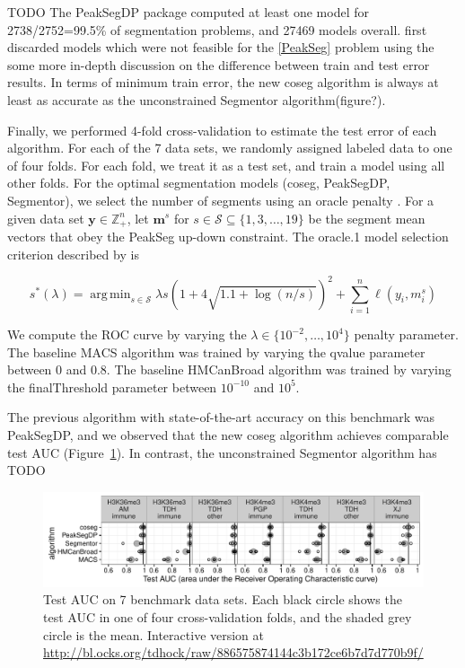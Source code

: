 \documentclass{article}
\DeclareMathOperator*{\argmin}{arg\,min}
\newcommand{\ZZ}{\mathbb Z}
\begin{document}
TODO The PeakSegDP package computed at least one model for
2738/2752=99.5\% of segmentation problems, and 27469 models
overall. first discarded models which were not feasible for the
\ref{PeakSeg} problem using the some more in-depth discussion on the
difference between train and test error results. In terms of minimum
train error, the new coseg algorithm is always at least as accurate as
the unconstrained Segmentor algorithm(figure?). 

Finally, we performed 4-fold cross-validation to estimate the test
error of each algorithm. For each of the 7 data sets, we randomly
assigned labeled data to one of four folds. For each fold, we treat it
as a test set, and train a model using all other folds. For the
optimal segmentation models (coseg, PeakSegDP, Segmentor), we select
the number of segments using an oracle penalty
\citep{cleynen2013segmentation}. For a given data set
$\mathbf y\in\ZZ_+^n$, let $\mathbf m^s$ for
$s\in\mathcal S\subseteq \{1, 3,\dots, 19\}$ be the segment mean
vectors that obey the PeakSeg up-down constraint. The oracle.1 model
selection criterion described by \citet{HOCKING-PeakSeg} is

\begin{equation}
  \label{eq:oracle}
  s^*(\lambda) = \argmin_{s\in\mathcal S}
  \lambda s\left(1 + 4\sqrt{1.1 + \log(n/s)}\right)^2
  +\sum_{i=1}^n \ell(y_i, m_i^s)
\end{equation}

We compute the ROC curve by varying the
$\lambda\in\{10^{-2}, \dots,10^4\}$ penalty parameter. The baseline
MACS algorithm was trained by varying the qvalue parameter between 0
and 0.8. The baseline HMCanBroad algorithm was trained by varying the
finalThreshold parameter between $10^{-10}$ and $10^5$. 

The previous algorithm with state-of-the-art accuracy on this
benchmark was PeakSegDP, and we observed that the new coseg algorithm
achieves comparable test AUC (Figure~\ref{fig:test-error-dots}). In
contrast, the unconstrained Segmentor algorithm has TODO



\begin{figure}[b!]
  \centering
  \includegraphics[width=\textwidth]{figure-test-error-dots}
  \caption{Test AUC on 7 benchmark data sets. Each black circle shows
    the test AUC in one of four cross-validation folds, and the shaded
    grey circle is the mean. Interactive version at
    \url{http://bl.ocks.org/tdhock/raw/886575874144c3b172ce6b7d7d770b9f/}}
  \label{fig:test-error-dots}
\end{figure}
\end{document}
